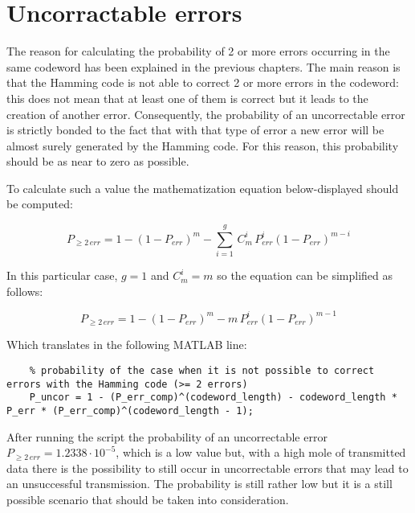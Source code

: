 \vspace{40px} \section{Uncorractable errors} \label{uncorrectable}
The reason for calculating the probability of 2 or more errors occurring in the same codeword has been explained in the previous chapters. The main reason is that the Hamming code is not able to correct 2 or more errors in the codeword: this does not mean that at least one of them is correct but it leads to the creation of another error. Consequently, the probability of an uncorrectable error is strictly bonded to the fact that with that type of error a new error will be almost surely generated by the Hamming code. For this reason, this probability should be as near to zero as possible.

To calculate such a value the mathematization equation below-displayed should be computed:

\begin{equation*}
    P_{\geq2\,err} = 1 - (1 - P_{err})^m - \sum_{i = 1}^g\, C^i_m\,P_{err}^i(1 - P_{err})^{m - i}
\end{equation*}

\noindent In this particular case, $g = 1$ and $C^i_m = m$ so the equation can be simplified as follows:

\begin{equation*}
    P_{\geq2\,err} = 1 - (1 - P_{err})^m - m\,P_{err}^i(1 - P_{err})^{m - 1}
\end{equation*}

\noindent Which translates in the following MATLAB line:

\begin{lstlisting}
    % probability of the case when it is not possible to correct errors with the Hamming code (>= 2 errors)
    P_uncor = 1 - (P_err_comp)^(codeword_length) - codeword_length * P_err * (P_err_comp)^(codeword_length - 1);
\end{lstlisting}

\noindent After running the script the probability of an uncorrectable error $P_{\geq2\,err} = 1.2338\cdot10^{-5}$, which is a low value but, with a high mole of transmitted data there is the possibility to still occur in uncorrectable errors that may lead to an unsuccessful transmission. The probability is still rather low but it is a still possible scenario that should be taken into consideration.


